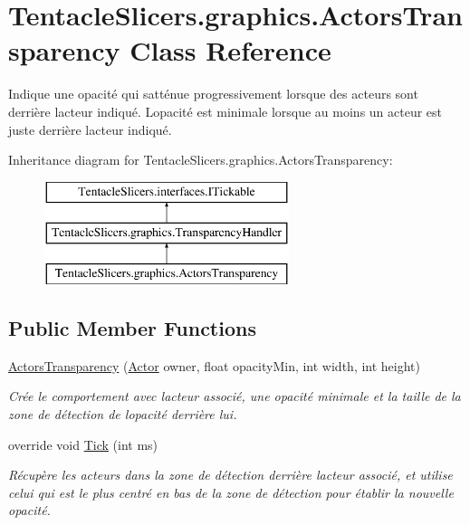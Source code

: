 \hypertarget{class_tentacle_slicers_1_1graphics_1_1_actors_transparency}{}\section{Tentacle\+Slicers.\+graphics.\+Actors\+Transparency Class Reference}
\label{class_tentacle_slicers_1_1graphics_1_1_actors_transparency}


Indique une opacité qui s\textquotesingle{}atténue progressivement lorsque des acteurs sont derrière l\textquotesingle{}acteur indiqué. L\textquotesingle{}opacité est minimale lorsque au moins un acteur est juste derrière l\textquotesingle{}acteur indiqué.  


Inheritance diagram for Tentacle\+Slicers.\+graphics.\+Actors\+Transparency\+:\begin{figure}[H]
\begin{center}
\leavevmode
\includegraphics[height=3.000000cm]{class_tentacle_slicers_1_1graphics_1_1_actors_transparency}
\end{center}
\end{figure}
\subsection*{Public Member Functions}
\begin{DoxyCompactItemize}
\item 
\hyperlink{class_tentacle_slicers_1_1graphics_1_1_actors_transparency_a42f066e20b0811eb02981b4504e5c8da}{Actors\+Transparency} (\hyperlink{class_tentacle_slicers_1_1actors_1_1_actor}{Actor} owner, float opacity\+Min, int width, int height)
\begin{DoxyCompactList}\small\item\em Crée le comportement avec l\textquotesingle{}acteur associé, une opacité minimale et la taille de la zone de détection de l\textquotesingle{}opacité derrière lui. \end{DoxyCompactList}\item 
override void \hyperlink{class_tentacle_slicers_1_1graphics_1_1_actors_transparency_ab8b40757e45cc24f5ac97a356cc9701b}{Tick} (int ms)
\begin{DoxyCompactList}\small\item\em Récupère les acteurs dans la zone de détection derrière l\textquotesingle{}acteur associé, et utilise celui qui est le plus centré en bas de la zone de détection pour établir la nouvelle opacité. \end{DoxyCompactList}\end{DoxyCompactItemize}
